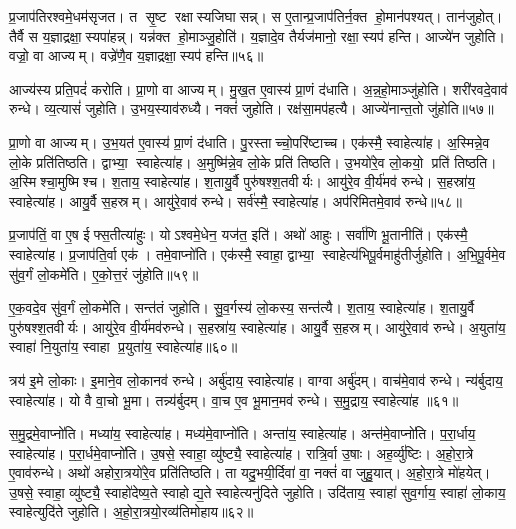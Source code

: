 प्र॒जाप॑तिरश्वमे॒धम॑सृजत। त सृ॒ष्ट रक्षास्यजिघासन्न्। स ए॒तान्प्र॒जाप॑तिर्न॒क्त हो॒मान॑पश्यत्। तान॑जुहोत्। तैर्वै स य॒ज्ञाद्रक्षा॒स्यपा॑हन्न्। यन्न॑क्त हो॒माञ्जु॒होति॑। य॒ज्ञादे॒व तैर्यज॑मानो॒ रक्षा॒स्यप॑ हन्ति। आज्ये॑न जुहोति। वज्रो॒ वा आज्यम्। वज्रे॑णै॒व य॒ज्ञाद्रक्षा॒स्यप॑ हन्ति॥५६॥

आज्य॑स्य प्रति॒पदं॑ करोति। प्रा॒णो वा आज्यम्। मु॒ख॒त ए॒वास्य॑ प्रा॒णं द॑धाति। अ॒न्न॒हो॒माञ्जु॑होति। शरी॑रवदे॒वाव॑ रुन्धे। व्य॒त्यासं॑ जुहोति। उ॒भय॒स्याव॑रुध्यै। नक्तं॑ जुहोति। रक्ष॑सा॒मप॑हत्यै। आज्ये॑नान्त॒तो जु॑होति॥५७॥

प्रा॒णो वा आज्यम्। उ॒भ॒यत॑ ए॒वास्य॑ प्रा॒णं द॑धाति। पु॒रस्ताच्चो॒परि॑ष्टाच्च। एक॑स्मै॒ स्वाहेत्या॑ह। अ॒स्मिन्ने॒व लो॒के प्रति॑तिष्ठति। द्वाभ्या॒ स्वाहेत्या॑ह। अ॒मुष्मि॑न्ने॒व लो॒के प्रति॑ तिष्ठति। उ॒भयो॑रे॒व लो॒कयो॒ प्रति॑ तिष्ठति। अ॒स्मिश्चा॒मुष्मिश्च। श॒ताय॒ स्वाहेत्या॑ह। श॒तायु॒र्वै पुरु॑षश्श॒तवीर्यः। आयु॑रे॒व वी॒र्य॑मव॑ रुन्धे। स॒हस्रा॑य॒ स्वाहेत्या॑ह। आयु॒र्वै स॒हस्रम्। आयु॑रे॒वाव॑ रुन्धे। सर्व॑स्मै॒ स्वाहेत्या॑ह। अप॑रिमितमे॒वाव॑ रुन्धे॥५८॥\anuvakamend[ए॒व य॒ज्ञाद्रक्षा॒स्यप॑हन्त्यन्त॒तो जु॑होति श॒ताय॒ स्वाहेत्या॑ह स॒प्त च॑]

प्र॒जाप॑तिं॒ वा ए॒ष ईफ्स॒तीत्या॑हुः। योऽश्वमे॒धेन॒ यज॑त॒ इति॑। अथो॑ आहुः। सर्वा॑णि भू॒तानीति॑। एक॑स्मै॒ स्वाहेत्या॑ह। प्र॒जाप॑ति॒र्वा एक॑। तमे॒वाप्नो॑ति। एक॑स्मै॒ स्वाहा॒ द्वाभ्या॒ स्वाहेत्य॑भिपू॒र्वमाहु॑तीर्जुहोति। अ॒भि॒पू॒र्वमे॒व सु॑व॒र्गं लो॒कमे॑ति। ए॒को॒त्त॒रं जु॑होति॥५९॥

ए॒क॒वदे॒व सु॑व॒र्गं लो॒कमे॑ति। सन्त॑तं जुहोति। सु॒व॒र्गस्य॑ लो॒कस्य॒ सन्त॑त्यै। श॒ताय॒ स्वाहेत्या॑ह। श॒तायु॒र्वै पुरु॑षश्श॒तवीर्यः। आयु॑रे॒व वी॒र्य॑मव॑रुन्धे। स॒हस्रा॑य॒ स्वाहेत्या॑ह। आयु॒र्वै स॒हस्रम्। आयु॑रे॒वाव॑ रुन्धे। अ॒युता॑य॒ स्वाहा॑ नि॒युता॑य॒ स्वाहा प्र॒युता॑य॒ स्वाहेत्या॑ह॥६०॥

त्रय॑ इ॒मे लो॒काः। इ॒माने॒व लो॒कानव॑ रुन्धे। अर्बु॑दाय॒ स्वाहेत्या॑ह। वाग्वा अर्बु॑दम्। वाच॑मे॒वाव॑ रुन्धे। न्य॑र्बुदाय॒ स्वाहेत्या॑ह। यो वै वा॒चो भू॒मा। तन्न्य॑र्बुदम्। वा॒च ए॒व भू॒मान॒मव॑ रुन्धे। स॒मु॒द्राय॒ स्वाहेत्या॑ह ॥६१॥

स॒मु॒द्रमे॒वाप्नो॑ति। मध्या॑य॒ स्वाहेत्या॑ह। मध्य॑मे॒वाप्नो॑ति। अन्ता॑य॒ स्वाहेत्या॑ह। अन्त॑मे॒वाप्नो॑ति। प॒रा॒र्धाय॒ स्वाहेत्या॑ह। प॒रा॒र्धमे॒वाप्नो॑ति। उ॒षसे॒ स्वाहा॒ व्यु॑ष्ट्यै॒ स्वाहेत्या॑ह। रात्रि॒र्वा उ॒षाः। अह॒र्व्यु॑ष्टिः। अ॒हो॒रा॒त्रे ए॒वाव॑रुन्धे। अथो॑ अहोरा॒त्रयो॑रे॒व प्रति॑तिष्ठति। ता यदु॒भयी॒र्दिवा॑ वा॒ नक्तं॑ वा जुहु॒यात्। अ॒हो॒रा॒त्रे मो॑हयेत्। उ॒षसे॒ स्वाहा॒ व्यु॑ष्ट्यै॒ स्वाहो॑देष्य॒ते स्वाहोद्य॒ते स्वाहेत्यनु॑दिते जुहोति। उदि॑ताय॒ स्वाहा॑ सुव॒र्गाय॒ स्वाहा॑ लो॒काय॒ स्वाहेत्युदि॑ते जुहोति। अ॒हो॒रा॒त्रयो॒रव्य॑तिमोहाय॥६२॥\anuvakamend[ए॒को॒त्त॒रं जु॑होति प्र॒युता॑य॒ स्वाहेत्या॑ह समु॒द्राय॒ स्वाहेत्या॒हाह॒र्व्यु॑ष्टिस्स॒प्त च॑]

